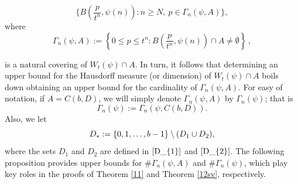 \documentclass[12pt]{article}
\theoremstyle{definition}
\theoremstyle{remark}
\begin{document}
$$\Big\{B\left(\frac{p}{t^{n}},\psi(n)\right) :n\geq N,\ p\in\Gamma_n (\psi,A)\Big\},$$
where 
$$
\Gamma_n (\psi,A) := \left\{0\le p\le t^{n}:  \textstyle{B\left(\frac{p}{t^{n}},\psi(n)\right)}\cap  A\neq\emptyset\right\}  \, , $$

\noindent is a natural covering of $W_{t}(\psi) \cap A$.   In turn, it follows that determining an upper bound for the Hausdorff measure (or dimension)  of $W_{t}(\psi) \cap A$  boils down obtaining an upper bound for the cardinality of 
$
\Gamma_n (\psi,A) $. %
For easy of notation, if $A=C(b,D)$, we will simply denote $\Gamma_{n}(\psi,A)$ by $\Gamma_{n}(\psi)$; that is 
$$
\Gamma_{n}(\psi)  :=  \Gamma_{n}(\psi,C(b,D))  .
$$
Also, we let
\begin{equation}\label{D_{*}}
D_{*}:=\{0,1,\ldots,b-1\}\setminus(D_{1}\cup D_{2}),
\end{equation}
where the sets $D_{1}$ and $D_{2}$ are defined in $\eqref{D_{1}}$ and $\eqref{D_{2}}$. 
The following proposition provides upper bounds for $\#\Gamma_n(\psi, A)$ and $\#\Gamma_n(\psi)$, which play key roles in the proofs of Theorem \ref{11} and Theorem \ref{12sv}, respectively.
\end{document}

